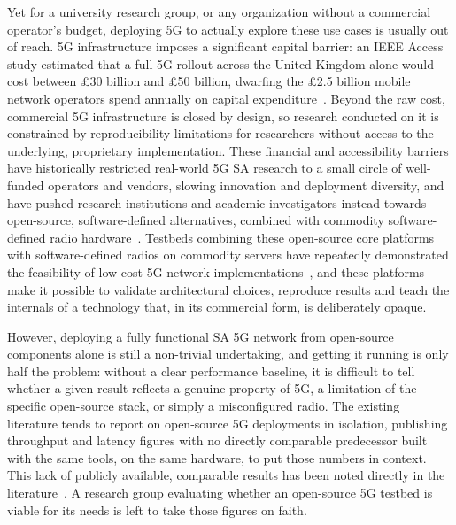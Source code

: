 Yet for a university research group, or any organization without a commercial operator's budget, deploying 5G to actually explore these use cases is usually out of reach. 5G infrastructure imposes a significant capital barrier: an IEEE Access study estimated that a full 5G rollout across the United Kingdom alone would cost between £30 billion and £50 billion, dwarfing the £2.5 billion mobile network operators spend annually on capital expenditure~\cite{patwary2020potential}. Beyond the raw cost, commercial 5G infrastructure is closed by design, so research conducted on it is constrained by reproducibility limitations for researchers without access to the underlying, proprietary implementation. These financial and accessibility barriers have historically restricted real-world 5G \gls{SA} research to a small circle of well-funded operators and vendors, slowing innovation and deployment diversity, and have pushed research institutions and academic investigators instead towards open-source, software-defined alternatives, combined with commodity software-defined radio hardware~\cite{hasan2023building, tio2025exploring5g, mamushiane2023deploying}. Testbeds combining these open-source core platforms with software-defined radios on commodity servers have repeatedly demonstrated the feasibility of low-cost 5G network implementations~\cite{barbosa2025opensource}, and these platforms make it possible to validate architectural choices, reproduce results and teach the internals of a technology that, in its commercial form, is deliberately opaque.

However, deploying a fully functional \gls{SA} 5G network from open-source components alone is still a non-trivial undertaking, and getting it running is only half the problem: without a clear performance baseline, it is difficult to tell whether a given result reflects a genuine property of 5G, a limitation of the specific open-source stack, or simply a misconfigured radio. The existing literature tends to report on open-source 5G deployments in isolation, publishing throughput and latency figures with no directly comparable predecessor built with the same tools, on the same hardware, to put those numbers in context. This lack of publicly available, comparable results has been noted directly in the literature~\cite{rouili2024evaluating}. A research group evaluating whether an open-source 5G testbed is viable for its needs is left to take those figures on faith.

